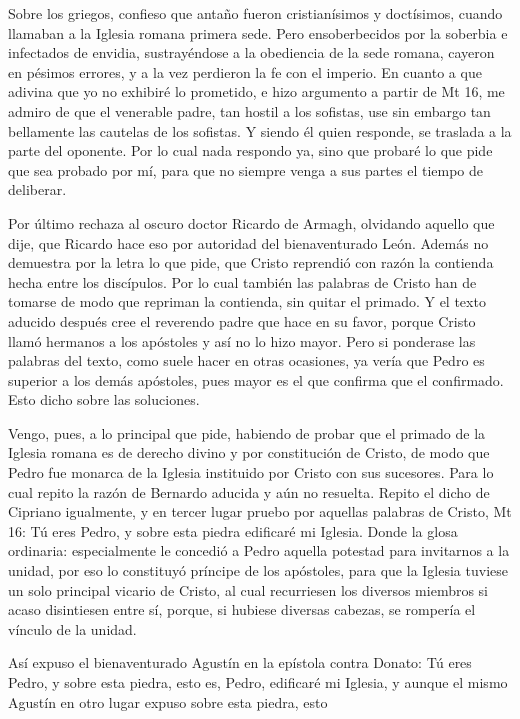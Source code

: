 Sobre los griegos, confieso que antaño fueron cristianísimos y doctísimos, cuando llamaban a la Iglesia romana primera sede. Pero ensoberbecidos por la soberbia e infectados de envidia, sustrayéndose a la obediencia de la sede romana, cayeron en pésimos errores, y a la vez perdieron la fe con el imperio. En cuanto a que adivina que yo no exhibiré lo prometido, e hizo argumento a partir de Mt 16, me admiro de que el venerable padre, tan hostil a los sofistas, use sin embargo tan bellamente las cautelas de los sofistas. Y siendo él quien responde, se traslada a la parte del oponente. Por lo cual nada respondo ya, sino que probaré lo que pide que sea probado por mí, para que no siempre venga a sus partes el tiempo de deliberar.

Por último rechaza al oscuro doctor Ricardo de Armagh, olvidando aquello que dije, que Ricardo hace eso por autoridad del bienaventurado León. Además no demuestra por la letra lo que pide, que Cristo reprendió con razón la contienda hecha entre los discípulos. Por lo cual también las palabras de Cristo han de tomarse de modo que repriman la contienda, sin quitar el primado. Y el texto aducido después cree \marginpar{\small[274]} el reverendo padre que hace en su favor, porque Cristo llamó hermanos a los apóstoles y así no lo hizo mayor. Pero si ponderase las palabras del texto, como suele hacer en otras ocasiones, ya vería que Pedro es superior a los demás apóstoles, pues mayor es el que confirma que el confirmado. Esto dicho sobre las soluciones.

Vengo, pues, a lo principal que pide, habiendo de probar que el primado de la Iglesia romana es de derecho divino y por constitución de Cristo, de modo que Pedro fue monarca de la Iglesia instituido por Cristo con sus sucesores. Para lo cual repito la razón de Bernardo aducida y aún no resuelta. Repito el dicho de Cipriano igualmente, y en tercer lugar pruebo por aquellas palabras de Cristo, Mt 16: Tú eres Pedro, y sobre esta piedra edificaré mi Iglesia. Donde la glosa ordinaria: especialmente le concedió a Pedro aquella potestad para invitarnos a la unidad, por eso lo constituyó príncipe de los apóstoles, para que la Iglesia tuviese un solo principal vicario de Cristo, al cual recurriesen los diversos miembros si acaso disintiesen entre sí, porque, si hubiese diversas cabezas, se rompería el vínculo de la unidad.

Así expuso el bienaventurado Agustín en la epístola contra Donato: Tú eres Pedro, y sobre esta piedra, esto es, Pedro, edificaré mi Iglesia, y aunque el mismo Agustín en otro lugar expuso sobre esta piedra, esto

